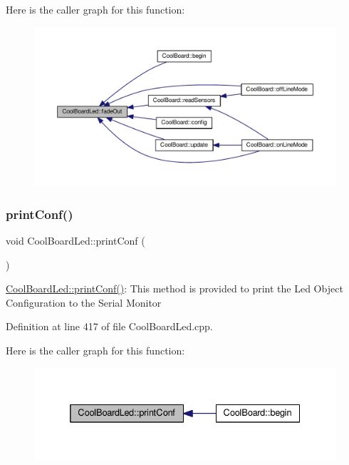 Here is the caller graph for this function\+:\nopagebreak
\begin{figure}[H]
\begin{center}
\leavevmode
\includegraphics[width=350pt]{class_cool_board_led_a93d545679237e8cc858324367149775c_icgraph}
\end{center}
\end{figure}
\mbox{\label{class_cool_board_led_a8ed3053a36f0ed4a131f43b5b17efb61}} 
\subsubsection{\texorpdfstring{print\+Conf()}{printConf()}}
{\footnotesize\ttfamily void Cool\+Board\+Led\+::print\+Conf (\begin{DoxyParamCaption}{ }\end{DoxyParamCaption})}

\hyperlink{class_cool_board_led_a8ed3053a36f0ed4a131f43b5b17efb61}{Cool\+Board\+Led\+::print\+Conf()}\+: This method is provided to print the Led Object Configuration to the Serial Monitor 

Definition at line 417 of file Cool\+Board\+Led.\+cpp.

Here is the caller graph for this function\+:\nopagebreak
\begin{figure}[H]
\begin{center}
\leavevmode
\includegraphics[width=332pt]{class_cool_board_led_a8ed3053a36f0ed4a131f43b5b17efb61_icgraph}
\end{center}
\end{figure}
\mbox{\label{class_cool_board_led_ad5f0de4c628cbfbf49896042831c64ad}} 

